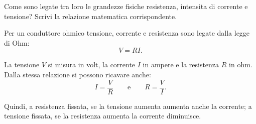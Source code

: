 
\begin{esercizio}
Come sono legate tra loro le grandezze fisiche resistenza, intensita di
corrente e tensione? Scrivi la relazione matematica corrispondente.
\end{esercizio}

\begin{soluzione}
Per un conduttore ohmico tensione, corrente e resistenza sono legate dalla
legge di Ohm:
\[
V=RI.
\]

La tensione \(V\) si misura in volt, la corrente \(I\) in ampere e la
resistenza \(R\) in ohm. Dalla stessa relazione si possono ricavare anche:
\[
I=\frac{V}{R}
\qquad\text{e}\qquad
R=\frac{V}{I}.
\]

Quindi, a resistenza fissata, se la tensione aumenta aumenta anche la corrente;
a tensione fissata, se la resistenza aumenta la corrente diminuisce.
\end{soluzione}
